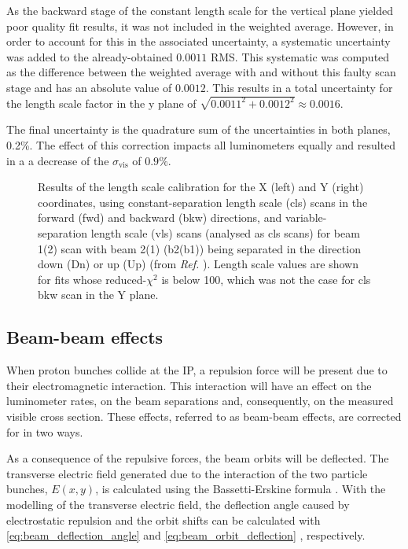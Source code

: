 As the backward stage of the constant length scale for the vertical plane yielded poor quality fit results, it was not included in the weighted average. However, in order to account for this in the associated uncertainty, a systematic uncertainty was added to the already-obtained $0.0011$ RMS. This systematic was computed as the difference between the weighted average with and without this faulty scan stage and has an absolute value of $0.0012$. This results in a total uncertainty for the length scale factor in the y plane of $\sqrt{0.0011^2 + 0.0012^2} \approx 0.0016$.

The final uncertainty is the quadrature sum of the uncertainties in both planes, 0.2\%. The effect of this correction impacts all luminometers equally and resulted in a a decrease of the $\sigma_{\mathrm{vis}}$ of $0.9\%$.

\begin{figure}[h!]
	\centering
	\caption[Length scale calibration results]{Results of the length scale calibration for the X (left) and Y (right) coordinates, using constant-separation length scale (cls) scans in the forward (fwd) and backward (bkw) directions, and variable-separation length scale (vls) scans (analysed as cls scans) for beam 1(2) scan with beam 2(1) (b2(b1)) being separated in the direction down (Dn) or up (Up) (from \textit{Ref.} \cite{CMS-DP-2024-068}). Length scale values are shown for fits whose reduced-$\chi^2$ is below 100, which was not the case for cls bkw scan in the Y plane.}
	\label{fig:length_scale_fit_summary}
\end{figure}

\subsection{Beam-beam effects}

When proton bunches collide at the IP, a repulsion force will be present due to their electromagnetic interaction. This interaction will have an effect on the luminometer rates, on the beam separations and, consequently, on the measured visible cross section. These effects, referred to as beam-beam effects, are corrected for in two ways.

As a consequence of the repulsive forces, the beam orbits will be deflected. The transverse electric field generated due to the interaction of the two particle bunches, $E(x, y)$, is calculated using the Bassetti-Erskine formula \cite{Bassetti:122227}. With the modelling of the transverse electric field, the deflection angle caused by electrostatic repulsion and the orbit shifts can be calculated with \autoref{eq:beam_deflection_angle} and \autoref{eq:beam_orbit_deflection} \cite{PhysRevLett.62.2949}, respectively.

